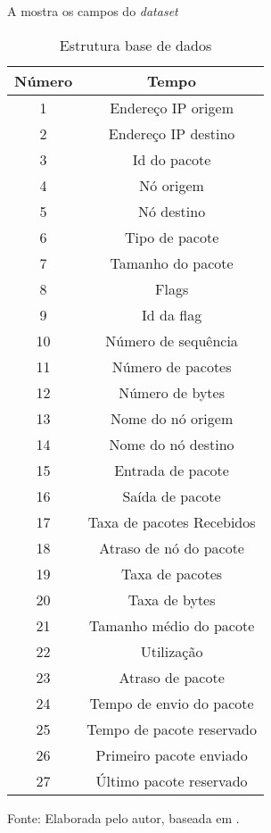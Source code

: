 A  mostra os campos do \textit{dataset} 

\begin{table}[!b]
	\centering
	\begin{threeparttable}
		\caption{Estrutura base de dados \cite{DataMining}}
		\label{Tab:DataMining}
		\begin{tabular}{c c }
			\toprule
			\textbf{Número} & \textbf{Tempo}
			\\ \midrule
			1 &  Endereço IP origem  \\ \midrule
			2 &  Endereço IP destino  \\ \midrule
			3 &  Id do pacote  \\ \midrule
			4 &  Nó origem  \\ \midrule
			5 &  Nó destino  \\ \midrule
			6 &  Tipo de pacote  \\ \midrule
			7 &  Tamanho do pacote  \\ \midrule
			8 &  Flags  \\ \midrule
			9 &   Id da flag  \\ \midrule
			10 &  Número de sequência  \\ \midrule
			11 &  Número de pacotes  \\ \midrule
			12 &  Número de bytes  \\ \midrule
			13 &  Nome do nó origem  \\ \midrule
			14 &  Nome do nó destino  \\ \midrule
			15 &  Entrada de pacote  \\ \midrule
			16 &  Saída de pacote  \\ \midrule
			17 &  Taxa de pacotes Recebidos \\ \midrule%
			18 &  Atraso de nó do pacote  \\ \midrule
			19 &  Taxa de pacotes\\ \midrule
			20 &  Taxa de bytes  \\ \midrule
			21 &  Tamanho  médio do pacote  \\ \midrule
			22 &  Utilização  \\ \midrule
			23 &  Atraso de pacote  \\ \midrule
			24 &  Tempo de envio do pacote  \\ \midrule
			25 &  Tempo de pacote reservado  \\ \midrule
			26 &  Primeiro pacote enviado  \\ \midrule
			27 &  Último pacote reservado \\ \bottomrule
		\end{tabular}
		{Fonte: Elaborada pelo autor, baseada em \cite{DataMining}.}
	\end{threeparttable}
\end{table}


